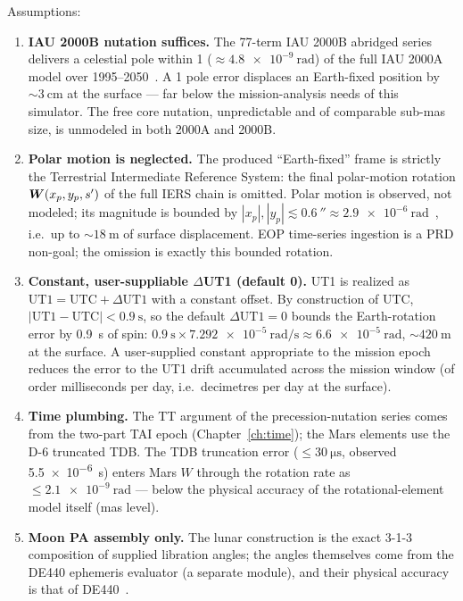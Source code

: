 Assumptions:
\begin{enumerate}
  \item \textbf{IAU 2000B nutation suffices.} The 77-term IAU 2000B
    abridged series delivers a celestial pole within \qty{1}{\mas}
    ($\approx \qty{4.8e-9}{\radian}$) of the full IAU 2000A model over
    1995--2050~\cite{mccarthy2003}. A \qty{1}{\mas} pole error displaces an
    Earth-fixed position by $\sim \qty{3}{\centi\metre}$ at the surface
    --- far below the mission-analysis needs of this simulator. The free
    core nutation, unpredictable and of comparable sub-mas size, is
    unmodeled in both 2000A and 2000B.
  \item \textbf{Polar motion is neglected.} The produced ``Earth-fixed''
    frame is strictly the Terrestrial Intermediate Reference System: the
    final polar-motion rotation $\bm{W}(x_p, y_p, s')$ of the full IERS
    chain is omitted. Polar motion is observed, not modeled; its
    magnitude is bounded by $|x_p|, |y_p| \lesssim \qty{0.6}{\arcsecond}
    \approx \qty{2.9e-6}{\radian}$~\cite{iers2010}, i.e.\ up to
    $\sim \qty{18}{\metre}$ of surface displacement. EOP time-series
    ingestion is a PRD non-goal; the omission is exactly this bounded
    rotation.
  \item \textbf{Constant, user-suppliable $\Delta$UT1 (default 0).}
    UT1 is realized as $\mathrm{UT1} = \mathrm{UTC} + \Delta\mathrm{UT1}$
    with a constant offset. By construction of UTC,
    $|\mathrm{UT1} - \mathrm{UTC}| < \qty{0.9}{\second}$, so the default
    $\Delta\mathrm{UT1} = 0$ bounds the Earth-rotation error by
    \qty{0.9}{\second} of spin: $\qty{0.9}{\second} \times
    \qty{7.292e-5}{\radian\per\second} \approx \qty{6.6e-5}{\radian}$,
    $\sim \qty{420}{\metre}$ at the surface. A user-supplied constant
    appropriate to the mission epoch reduces the error to the UT1 drift
    accumulated across the mission window (of order milliseconds per day,
    i.e.\ decimetres per day at the surface).
  \item \textbf{Time plumbing.} The TT argument of the precession-nutation
    series comes from the two-part TAI epoch (Chapter~\ref{ch:time});
    the Mars elements use the D-6 truncated TDB. The TDB truncation error
    ($\leq \qty{30}{\micro\second}$, observed \qty{5.5e-6}{\second})
    enters Mars $W$ through the rotation rate as
    $\leq \qty{2.1e-9}{\radian}$ --- below the physical accuracy of the
    rotational-element model itself (mas level).
  \item \textbf{Moon PA assembly only.} The lunar construction is the
    exact 3-1-3 composition of supplied libration angles; the angles
    themselves come from the DE440 ephemeris evaluator (a separate
    module), and their physical accuracy is that of
    DE440~\cite{park2021}.
\end{enumerate}


